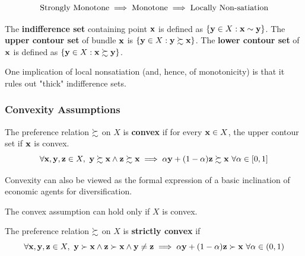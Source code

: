 \documentclass{report}
\begin{document}
 			\begin{proposition}[Exercise 3.B.1]
 				\begin{equation}
 					\text{{Strongly Monotone}} \implies \text{{Monotone}} \implies \text{{Locally Non-satiation}}
 				\end{equation}
 			\end{proposition}
 			
 			\begin{definition}
 				The \textbf{indifference set} containing point $\textbf{x}$ is defined as $\{\textbf{y} \in X: \textbf{x} \sim \textbf{y} \}$. The \textbf{upper contour set} of bundle $\textbf{x}$ is $\{\textbf{y} \in X: \textbf{y} \succsim \textbf{x}\}$. The \textbf{lower contour set} of $\textbf{x}$ is defined as $\{\textbf{y} \in X: \textbf{x} \succsim \textbf{y}\}$.
 			\end{definition}
 			
 			\begin{remark}
 				One implication of local nonsatiation (and, hence, of monotonicity) is that it rules out "thick" indifference sets.
 			\end{remark}
 			
 			\subsubsection{Convexity Assumptions}
 			
 			\begin{definition}[3.B.4]
 				The preference relation $\succsim$ on $X$ is \textbf{convex} if for every $\textbf{x} \in X$, the upper contour set if $\textbf{x}$ is convex.
 				\begin{equation}
 					\forall \vex, \vey, \vez \in X,\ \vey \pref \vex \land \vez \pref \vex \implies \alpha \vey + (1-\alpha) \vez \pref \vex\ \forall \alpha \in [0, 1]
 				\end{equation}
 			\end{definition}
 			
 			\begin{remark}
 				Convexity can also be viewed as the formal expression of a basic inclination of economic agents for diversification.
 			\end{remark}
 			
 			\begin{remark}
 				The convex assumption can hold only if $X$ is convex.
 			\end{remark}
 			
 			\begin{definition}[3.B.5]
 				The preference relation $\succsim$ on $X$ is \textbf{strictly convex} if
 				\begin{equation}
 					\forall \textbf{x}, \textbf{y}, \textbf{z} \in X,\ \textbf{y} \succ \textbf{x} \land \textbf{z} \succ \textbf{x} \land \textbf{y} \neq \textbf{z} \implies \alpha \textbf{y} + (1-\alpha) \textbf{z} \succ \textbf{x}\ \forall \alpha \in (0, 1)
 				\end{equation}
 			\end{definition}
 			
\end{document}
